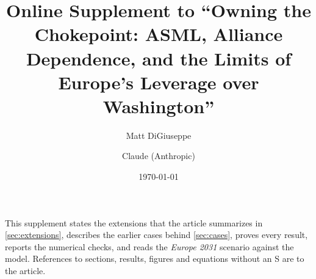 \documentclass[11pt]{article}
\title{Online Supplement to ``Owning the Chokepoint: ASML, Alliance Dependence, and the Limits of Europe's Leverage over Washington''}
\author{Matt DiGiuseppe \and Claude (Anthropic)}
\date{\today}
\begin{document}
\maketitle

\noindent This supplement states the extensions that the article summarizes in \cref{sec:extensions}, describes the earlier cases behind \cref{sec:cases}, proves every result, reports the numerical checks, and reads the \emph{Europe 2031} scenario against the model. References to sections, results, figures and equations without an S are to the article.










{\raggedright


}
\end{document}
